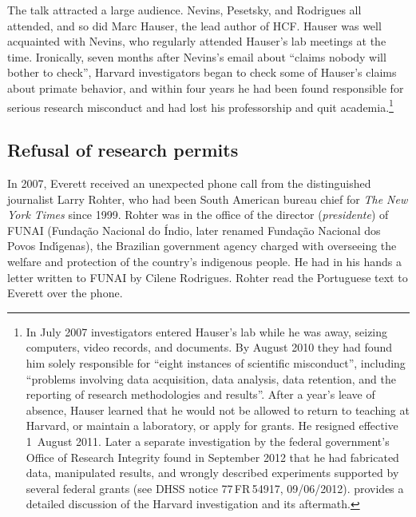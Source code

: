 \documentclass[output=paper,colorlinks,citecolor=brown
]{langscibook}
\begin{document}
The talk attracted a large audience. Nevins, Pesetsky, and Rodrigues
all attended, and so did Marc Hauser, the lead author of HCF. Hauser
was well acquainted with Nevins, who regularly attended Hauser's lab
meetings at the time. Ironically, seven months after Nevins's email
about ``claims nobody will bother to check'', Harvard investigators
began to check some of Hauser's claims about primate behavior, and
within four years he had been found responsible for serious research
misconduct and had lost his professorship and quit
academia.\footnote{\label{misconduct}
   In July 2007 investigators entered Hauser's lab while he was away,
   seizing computers, video records, and documents. By August 2010
   they had found him solely responsible for ``eight instances of
   scientific misconduct'', including ``problems involving data
   acquisition, data analysis, data retention, and the reporting of
   research methodologies and results''. After a year's leave of
   absence, Hauser learned that he would not be allowed to return
   to teaching at Harvard, or maintain a laboratory, or apply for grants.
   He resigned effective 1~August 2011. Later a separate investigation by
   the federal government's Office of Research Integrity found in September
   2012 that he had fabricated data, manipulated results, and wrongly
   described experiments supported by several federal grants (see DHSS
   notice 77\,FR\,54917, 09/06/2012). \citet{Gross11} provides a detailed
   discussion of the Harvard investigation and its aftermath.}

\subsection{Refusal of research permits}

In 2007, Everett received an unexpected phone call from the distinguished
journalist Larry Rohter, who had been South American bureau chief for
\textit{The New York Times} since 1999. Rohter was in the office of
the director (\textit{presidente}) of FUNAI
(Funda{\c{c}}{\~a}o Nacional do {\'I}ndio, later renamed
Funda{\c{c}}{\~a}o Nacional dos Povos Ind{\'\i}genas), the Brazilian
government agency charged with overseeing the welfare and protection of
the country's indigenous people.
He had in his hands a letter written to FUNAI by Cilene Rodrigues.
Rohter read the Portuguese text to Everett over the phone.
\end{document}
